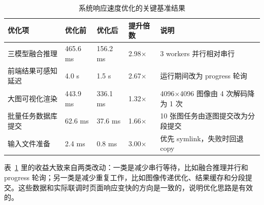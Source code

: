 \begin{table}[htbp]
  \centering
  \small
  \caption{系统响应速度优化的关键基准结果}
  \label{tab:ch5_perf}
  \begin{tabular}{p{3.0cm}p{2.2cm}p{2.2cm}p{2.0cm}p{4.0cm}}
    \toprule
    优化项 & 优化前 & 优化后 & 提升倍数 & 说明 \\
    \midrule
    三模型融合推理 & 465.6 ms & 156.2 ms & 2.98$\times$ & 3 workers 并行相对串行 \\
    前端结果可感知延迟 & 4.0 s & 1.5 s & 2.67$\times$ & 运行期间改为 progress 轮询 \\
    大图可视化渲染 & 443.9 ms & 336.1 ms & 1.32$\times$ & 4096$\times$4096 图像由 4 次解码降为 1 次 \\
    批量任务数据库提交 & 62.6 ms & 37.6 ms & 1.66$\times$ & 10 张图任务由逐图提交改为分段提交 \\
    输入文件准备 & 2.4 ms & 0.8 ms & 3.00$\times$ & 优先 symlink，失败时回退 copy \\
    \bottomrule
  \end{tabular}
\end{table}

表~\ref{tab:ch5_perf} 里的收益大致来自两类改动：一类是减少串行等待，比如融合推理并行和 progress 轮询；另一类是减少重复工作，比如图像传递优化、结果缓存和分段提交。这些数据和实际联调时页面响应变快的方向是一致的，说明优化思路是有效的。
